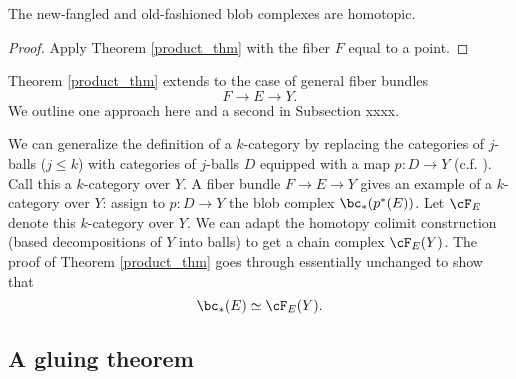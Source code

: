 
\medskip

\begin{cor}
\label{cor:new-old}
The new-fangled and old-fashioned blob complexes are homotopic.
\end{cor}
\begin{proof}
Apply Theorem \ref{product_thm} with the fiber $F$ equal to a point.
\end{proof}

\medskip

Theorem \ref{product_thm} extends to the case of general fiber bundles
\[
	F \to E \to Y .
\]
We outline one approach here and a second in Subsection xxxx.

We can generalize the definition of a $k$-category by replacing the categories
of $j$-balls ($j\le k$) with categories of $j$-balls $D$ equipped with a map $p:D\to Y$
(c.f. \cite{MR2079378}).
Call this a $k$-category over $Y$.
A fiber bundle $F\to E\to Y$ gives an example of a $k$-category over $Y$:
assign to $p:D\to Y$ the blob complex $\bc_*(p^*(E))$.
Let $\cF_E$ denote this $k$-category over $Y$.
We can adapt the homotopy colimit construction (based decompositions of $Y$ into balls) to
get a chain complex $\cF_E(Y)$.
The proof of Theorem \ref{product_thm} goes through essentially unchanged 
to show that
\[
	\bc_*(E) \simeq \cF_E(Y) .
\]








\subsection{A gluing theorem}
\label{sec:gluing}

